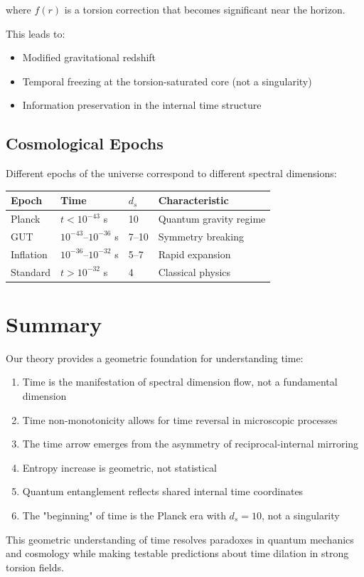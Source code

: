 where $f(r)$ is a torsion correction that becomes significant near the horizon.

This leads to:
\begin{itemize}
    \item Modified gravitational redshift
    \item Temporal freezing at the torsion-saturated core (not a singularity)
    \item Information preservation in the internal time structure
\end{itemize}

\subsection{Cosmological Epochs}

Different epochs of the universe correspond to different spectral dimensions:

\begin{center}
\begin{tabular}{llll}
\hline
Epoch & Time & $d_s$ & Characteristic \\ \hline
Planck & $t < 10^{-43}$ s & 10 & Quantum gravity regime \\
GUT & $10^{-43}$--$10^{-36}$ s & 7--10 & Symmetry breaking \\
Inflation & $10^{-36}$--$10^{-32}$ s & 5--7 & Rapid expansion \\
Standard & $t > 10^{-32}$ s & 4 & Classical physics \\
\hline
\end{tabular}
\end{center}

\section{Summary}

Our theory provides a geometric foundation for understanding time:
\begin{enumerate}
    \item Time is the manifestation of spectral dimension flow, not a fundamental dimension
    \item Time non-monotonicity allows for time reversal in microscopic processes
    \item The time arrow emerges from the asymmetry of reciprocal-internal mirroring
    \item Entropy increase is geometric, not statistical
    \item Quantum entanglement reflects shared internal time coordinates
    \item The "beginning" of time is the Planck era with $d_s = 10$, not a singularity
\end{enumerate}

This geometric understanding of time resolves paradoxes in quantum mechanics and cosmology while making testable predictions about time dilation in strong torsion fields.
